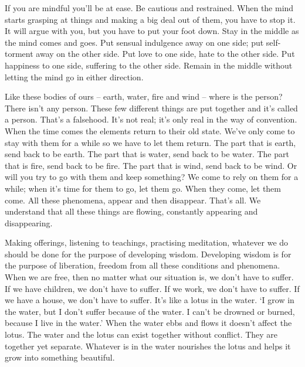 If you are mindful you'll be at ease. Be cautious and restrained. When the mind starts grasping at things and making a big deal out of them, you have to stop it. It will argue with you, but you have to put your foot down. Stay in the middle as the mind comes and goes. Put sensual indulgence away on one side; put self-torment away on the other side. Put love to one side, hate to the other side. Put happiness to one side, suffering to the other side. Remain in the middle without letting the mind go in either direction.

Like these bodies of ours -- earth, water, fire and wind -- where is the person? There isn't any person. These few different things are put together and it's called a person. That's a falsehood. It's not real; it's only real in the way of convention. When the time comes the elements return to their old state. We've only come to stay with them for a while so we have to let them return. The part that is earth, send back to be earth. The part that is water, send back to be water. The part that is fire, send back to be fire. The part that is wind, send back to be wind. Or will you try to go with them and keep something? We come to rely on them for a while; when it's time for them to go, let them go. When they come, let them come. All these phenomena,  appear and then disappear. That's all. We understand that all these things are flowing, constantly appearing and disappearing.

Making offerings, listening to teachings, practising meditation, whatever we do should be done for the purpose of developing wisdom. Developing wisdom is for the purpose of liberation, freedom from all these conditions and phenomena. When we are free, then no matter what our situation is, we don't have to suffer. If we have children, we don't have to suffer. If we work, we don't have to suffer. If we have a house, we don't have to suffer. It's like a lotus in the water. `I grow in the water, but I don't suffer because of the water. I can't be drowned or burned, because I live in the water.' When the water ebbs and flows it doesn't affect the lotus. The water and the lotus can exist together without conflict. They are together yet separate. Whatever is in the water nourishes the lotus and helps it grow into something beautiful.

